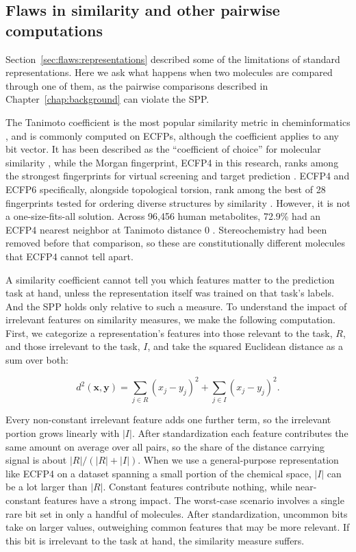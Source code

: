 \subsection{Flaws in similarity and other pairwise computations}\label{sec:flaws:similarity} 

Section~\ref{sec:flaws:representations} described some of the limitations of standard representations. Here we ask what happens when two molecules are compared through one of them, as the pairwise comparisons described in Chapter~\ref{chap:background} can violate the SPP.

The Tanimoto coefficient is the most popular similarity metric in cheminformatics \citep{LopezPerez2024}, and is commonly computed on ECFPs, although the coefficient applies to any bit vector. It has been described as the ``coefficient of choice'' for molecular similarity \citep{Willett2006}, while the Morgan fingerprint, ECFP4 in this research, ranks among the strongest fingerprints for virtual screening and target prediction \citep{Capecchi2020}. ECFP4 and ECFP6 specifically, alongside topological torsion, rank among the best of 28 fingerprints tested for ordering diverse structures by similarity \citep{OBoyle2016}. However, it is not a one-size-fits-all solution. Across 96,456 human metabolites, 72.9\% had an ECFP4 nearest neighbor at Tanimoto distance 0 \citep{Capecchi2020}. Stereochemistry had been removed before that comparison, so these are constitutionally different molecules that ECFP4 cannot tell apart. 

A similarity coefficient cannot tell you which features matter to the prediction task at hand, unless the representation itself was trained on that task's labels. And the SPP holds only relative to such a measure. To understand the impact of irrelevant features on similarity measures, we make the following computation. First, we categorize a representation's features into those relevant to the task, $R$, and those irrelevant to the task, $I$, and take the squared Euclidean distance as a sum over both:

\begin{equation}
d^2(\mathbf{x},\mathbf{y}) = \sum_{j \in R}(x_j-y_j)^2 + \sum_{j \in I}(x_j-y_j)^2 .
\label{eq:distance_split}
\end{equation}

Every non-constant irrelevant feature adds one further term, so the irrelevant portion grows linearly with $|I|$. After standardization each feature contributes the same amount on average over all pairs, so the share of the distance carrying signal is about $|R|/(|R|+|I|)$. When we use a general-purpose representation like ECFP4 on a dataset spanning a small portion of the chemical space, $|I|$ can be a lot larger than $|R|$. Constant features contribute nothing, while near-constant features have a strong impact. The worst-case scenario involves a single rare bit set in only a handful of molecules. After standardization, uncommon bits take on larger values, outweighing common features that may be more relevant. If this bit is irrelevant to the task at hand, the similarity measure suffers. 

